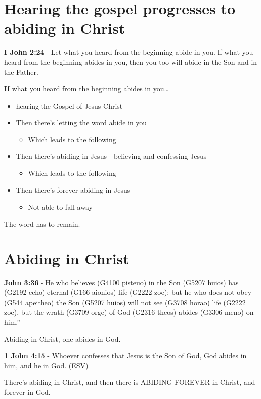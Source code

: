 \documentclass[11pt]{article}
\begin{document}
\section{Hearing the gospel progresses to abiding in Christ}
\label{sec:orge8a843e}
\textbf{I John 2:24} - Let what you heard from the beginning abide in you. If what you heard from the beginning abides in you, then you too will abide in the Son and in the Father.

\textbf{If} what you heard from the beginning abides in you\ldots{}

\begin{itemize}
\item hearing the Gospel of Jesus Christ
\item Then there's letting the word abide in you
\begin{itemize}
\item Which leads to the following
\end{itemize}
\item Then there's abiding in Jesus - believing and confessing Jesus
\begin{itemize}
\item Which leads to the following
\end{itemize}
\item Then there's forever abiding in Jesus
\begin{itemize}
\item Not able to fall away
\end{itemize}
\end{itemize}

The word has to remain.

\section{Abiding in Christ}
\label{sec:org7834d81}
\textbf{John 3:36} - He who believes (G4100 pisteuo) in the Son (G5207 huios) has (G2192 echo) eternal (G166 aionios) life (G2222 zoe); but he who does not obey (G544 apeitheo) the Son (G5207 huios) will not see (G3708 horao) life (G2222 zoe), but the wrath (G3709 orge) of God (G2316 theos) abides (G3306 meno) on him.”

Abiding in Christ, one abides in God.

\textbf{1 John 4:15} - Whoever confesses that Jesus is the Son of God, God abides in him, and he in God. (ESV)

There's abiding in Christ, and then there is ABIDING FOREVER in Christ, and forever in God.
\end{document}
